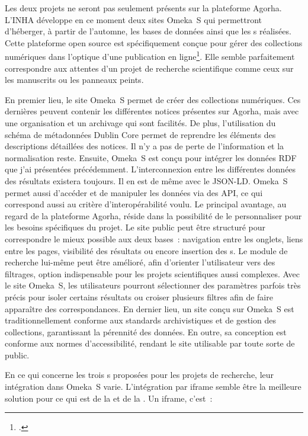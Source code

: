 Les deux projets ne seront pas seulement présents sur la plateforme Agorha. L’INHA développe en ce moment deux sites Omeka~S qui permettront d’héberger, à partir de l’automne, les bases de données ainsi que les s réalisées. Cette plateforme open source est spécifiquement conçue pour gérer des collections numériques dans l’optique d’une publication en ligne\footcite{noauthor_omeka_nodate}. Elle semble parfaitement correspondre aux attentes d’un projet de recherche scientifique comme ceux sur les manuscrits ou les panneaux peints.\par
En premier lieu, le site Omeka~S permet de créer des collections numériques. Ces dernières peuvent contenir les différentes notices présentes sur Agorha, mais avec une organisation et un archivage qui sont facilités. De plus, l’utilisation du schéma de métadonnées Dublin Core permet de reprendre les éléments des descriptions détaillées des notices. Il n’y a pas de perte de l’information et la normalisation reste. Ensuite, Omeka~S est conçu pour intégrer les données RDF que j’ai présentées précédemment. L’interconnexion entre les différentes données des résultats existera toujours. Il en est de même avec le JSON-LD. Omeka~S permet aussi d'accéder et de manipuler les données via des API, ce qui correspond aussi au critère d’interopérabilité voulu. Le principal avantage, au regard de la plateforme Agorha, réside dans la possibilité de le personnaliser pour les besoins spécifiques du projet. Le site public peut être structuré pour correspondre le mieux possible aux deux bases : navigation entre les onglets, liens entre les pages, visibilité des résultats ou encore insertion des s. Le module de recherche lui-même peut être amélioré, afin d’orienter l’utilisateur vers des filtrages, option indispensable pour les projets scientifiques aussi complexes. Avec le site Omeka~S, les utilisateurs pourront sélectionner des paramètres parfois très précis pour isoler certains résultats ou croiser plusieurs filtres afin de faire apparaître des correspondances. En dernier lieu, un site conçu sur Omeka~S est traditionnellement conforme aux standards archivistiques et de gestion des collections, garantissant la pérennité des données. En outre, sa conception est conforme aux normes d’accessibilité, rendant le site utilisable par toute sorte de public.\par
En ce qui concerne les trois s proposées pour les projets de recherche, leur intégration dans Omeka~S varie. L’intégration par iframe semble être la meilleure solution pour ce qui est de la  et de la . Un iframe, c’est~:\par
